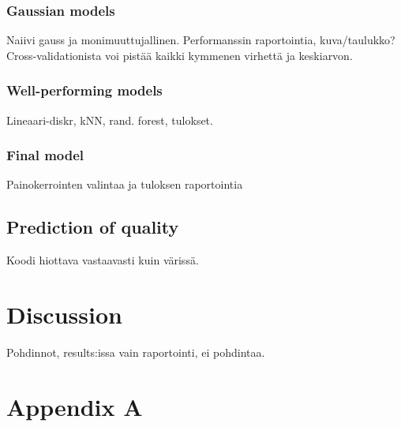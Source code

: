 \documentclass[twoside]{article}
\begin{document}
\begin{multicols}{2}
\subsubsection{Gaussian models}

Naiivi gauss ja monimuuttujallinen. Performanssin raportointia, kuva/taulukko? Cross-validationista voi pistää kaikki kymmenen virhettä ja keskiarvon.

\subsubsection{Well-performing models}

Lineaari-diskr, kNN, rand. forest, tulokset.

\subsubsection{Final model}

Painokerrointen valintaa ja tuloksen raportointia

\subsection{Prediction of quality}

Koodi hiottava vastaavasti kuin värissä.


\section{Discussion}

Pohdinnot, results:issa vain raportointi, ei pohdintaa.



{}


\section*{Appendix A}


\end{multicols}
\end{document}
